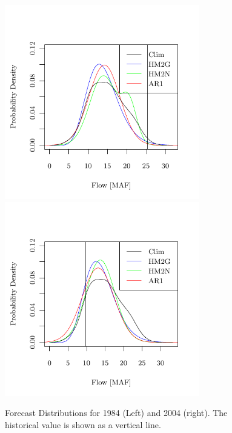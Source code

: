 \documentclass[wrr]{AGUTeX}
\begin{document}
\begin{figure}
\centering
\noindent\includegraphics[width=20pc]{plots/hmm-sim-figure11.pdf}
\noindent\includegraphics[width=20pc]{plots/hmm-sim-figure12.pdf}
\caption{Forecast Distributions for 1984 (Left) and 2004 (right).  The historical value is shown as a vertical line.}\label{fig:fcdist}
\end{figure}
\end{document}
